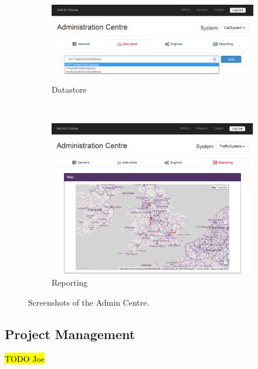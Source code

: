 \documentclass[10pt,a4paper]{article}
\begin{document}
\begin{figure}[h!b]
    \begin{subfigure}{0.49\textwidth}
        \includegraphics[width=\textwidth]{images/admin-centre_data.png}
        \vspace*{2.45cm}
        \caption{Datastore}
        \label{fig:admin-centre_data}
    \end{subfigure}
	~
	\begin{subfigure}{0.49\textwidth}
        \includegraphics[width=\textwidth]{images/admin-centre_report.png}
        \caption{Reporting}
        \label{fig:admin-centre_report}
    \end{subfigure}
    \caption{Screenshots of the Admin Centre.}
	\label{fig:admin-centre}
\end{figure}

\subsection{Project Management}

\hl{TODO Joe}

\end{document}
